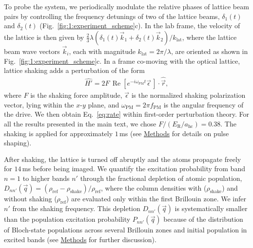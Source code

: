 \documentclass[superscriptaddress, reprint, amsmath, amssymb, aps, prl]{revtex4-2}
\renewcommand{\Re}{\operatorname{Re}}
\begin{document}
To probe the system, we periodically modulate the relative phases of lattice beam pairs by controlling the frequency detunings of two of the lattice beams, $\delta_1(t)$ and $\delta_2(t)$ (Fig.~\ref{fig:1:experiment_scheme}c). In the lab frame, the velocity of the lattice is then given by 
$\frac{2}{3} \lambda (\delta_1(t) \vec{k}_1 + \delta_2(t) \vec{k}_2) / k_\mathrm{lat}$, where the lattice beam wave vectors $\vec{k}_i$, each with magnitude $k_\mathrm{lat} = 2 \pi/\lambda$, are oriented as shown in Fig.\ \ref{fig:1:experiment_scheme}c.
In a frame co-moving with the optical lattice, lattice shaking adds a perturbation of the form
\begin{align}
    \hat{H'} = 2 F\, \Re[e^{-i \omega_{\mathrm{PM} } t} \vec{\epsilon}\,] \cdot \hat{\vec{r}},
\end{align}
where $F$ is the shaking force amplitude, $\vec{\epsilon}$ is the normalized shaking polarization vector, lying within the $x$-$y$ plane, and $\omega_\mathrm{PM} = 2\pi f_{\textrm{PM}}$ is the angular frequency of the drive. We then obtain Eq.~\eqref{eq:rate} within first-order perturbation theory. For all the results presented in the main text, we chose $F / (E_\mathrm{R} / a_{\mathrm{hc}}) = 0.38$.
The shaking is applied for approximately $1\,$ms (see \hyperref[sec:methods]{Methods} for details on pulse shaping).

After shaking, the lattice is turned off abruptly and the atoms propagate freely for $14\,$ms before being imaged. We quantify the excitation probability from band $n=1$ to higher bands $n'$ through the fractional depletion of atomic population, $D_{n n'}(\vec{q}) = (\rho_\mathrm{ref}-\rho_\mathrm{shake})/\rho_\mathrm{ref}$, where the column densities with ($\rho_\mathrm{shake}$) and without shaking ($\rho_\mathrm{ref}$) are evaluated only within the first Brillouin zone. We infer $n'$ from the shaking frequency. This depletion $D_{n n'}(\vec{q})$ is systematically smaller than the population excitation probability $P_{n n'}(\vec{q})$ because of the distribution of Bloch-state populations across several Brillouin zones and initial population in excited bands (see \hyperref[sec:diff_and_BM]{Methods} for further discussion).
\end{document}
